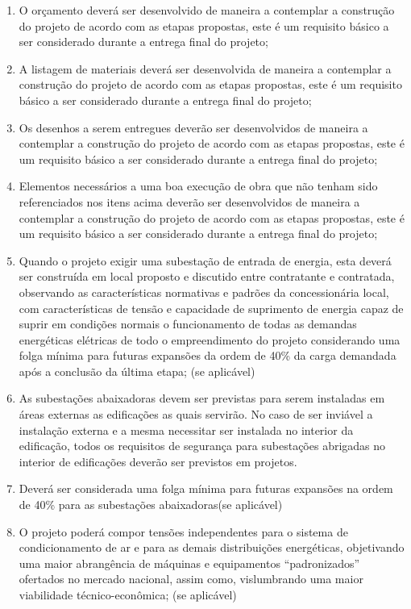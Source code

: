 \begin{enumerate}
	\item O orçamento deverá ser desenvolvido de maneira a contemplar a construção do projeto de acordo com as etapas propostas, este é um requisito básico a ser considerado durante a entrega final do projeto;
	
	\item A listagem de materiais deverá ser desenvolvida de maneira a contemplar a construção do projeto de acordo com as etapas propostas, este é um requisito básico a ser considerado durante a entrega final do projeto;
	
	\item Os desenhos a serem entregues deverão ser desenvolvidos de maneira a contemplar a construção do projeto de acordo com as etapas propostas, este é um requisito básico a ser considerado durante a entrega final do projeto;
	
	\item Elementos necessários a uma boa execução de obra que não tenham sido referenciados nos itens acima deverão ser desenvolvidos de maneira a contemplar a construção do projeto de acordo com as etapas propostas, este é um requisito básico a ser considerado durante a entrega final do projeto;
	
	\item Quando o projeto exigir uma subestação de entrada de energia, esta deverá ser construída em local proposto e discutido entre contratante e contratada, observando as características normativas e padrões da concessionária local, com características de tensão e capacidade de suprimento de energia capaz de suprir em condições normais o funcionamento de todas as demandas energéticas elétricas de todo o empreendimento do projeto considerando uma folga mínima para futuras expansões da ordem de 40\% da carga demandada após a conclusão da última etapa; (se aplicável)
	
	\item As subestações abaixadoras devem ser previstas para serem instaladas em áreas externas as edificações as quais servirão. No caso de ser inviável a instalação externa e a mesma necessitar ser instalada no interior da edificação, todos os requisitos de segurança para subestações abrigadas no interior de edificações deverão ser previstos em projetos.
	
	\item Deverá ser considerada uma folga mínima para futuras expansões na ordem de 40\% para as subestações abaixadoras(se aplicável)
	
	\item O projeto poderá compor tensões independentes para o sistema de condicionamento de ar e para as demais distribuições energéticas, objetivando uma maior abrangência de máquinas e equipamentos “padronizados” ofertados no mercado nacional, assim como, vislumbrando uma maior viabilidade técnico-econômica; (se aplicável)
	

\end{enumerate}
